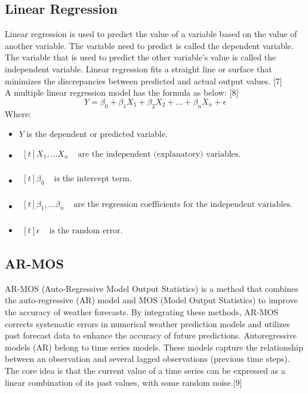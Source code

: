 \documentclass{ieeeojies}
\begin{document}
\subsection{Linear Regression}
Linear regression is used to predict the value of a variable based on the value of another variable. The variable need to predict is called the dependent variable. The variable that is used to predict the other variable's value is called the independent variable. Linear regression fits a straight line or surface that minimizes the discrepancies between predicted and actual output values. [7] \\
A multiple linear regression model has the formula as below: [8]
\[ Y = \beta_0 + \beta_1X_1 + \beta_2X_2 +...+ \beta_nX_n + \epsilon\]
Where:
\begin{itemize}
    \item $Y$ is the dependent or predicted variable.
    \item $\begin{aligned}[t]
            X_1,...X_n & \text{ are the independent (explanatory) variables.} \\
            \end{aligned}$
    \item $\begin{aligned}[t]
            \beta_0 & \text{ is the intercept term.} \\
            \end{aligned}$
    \item $\begin{aligned}[t]
            \beta_1,...\beta_n & \text{ are the regression coefficients for the independent variables.} \\
            \end{aligned}$
    \item $\begin{aligned}[t]
            \epsilon & \text{ is the random error.}
            \end{aligned}$        
\end{itemize}
\subsection{AR-MOS}
AR-MOS (Auto-Regressive Model Output Statistics) is a method that combines the auto-regressive (AR) model and MOS (Model Output Statistics) to improve the accuracy of weather forecasts. By integrating these methods, AR-MOS corrects systematic errors in numerical weather prediction models and utilizes past forecast data to enhance the accuracy of future predictions. 
Autoregressive models (AR) belong to time series models. These models capture the relationship between an observation and several lagged observations (previous time steps). The core idea is that the current value of a time series can be expressed as a linear combination of its past values, with some random noise.[9]
\end{document}
